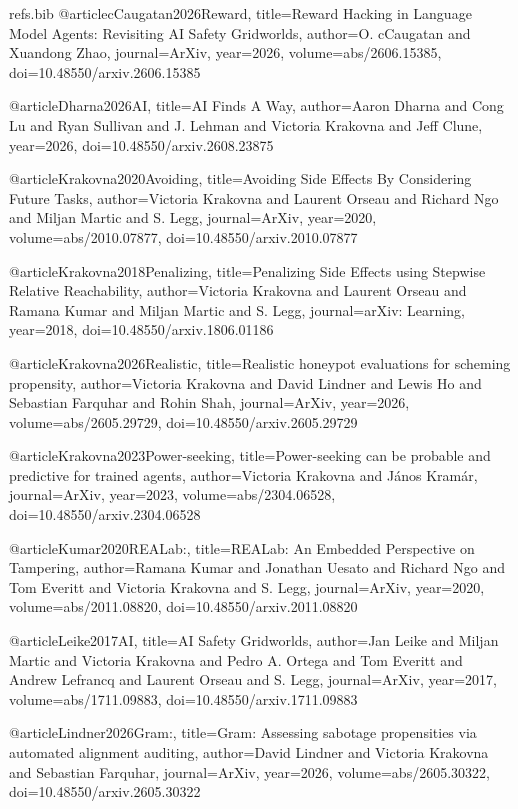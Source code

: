 \begin{filecontents}{refs.bib}
@article{cCaugatan2026Reward,
title={Reward Hacking in Language Model Agents: Revisiting AI Safety Gridworlds},
author={O. cCaugatan and Xuandong Zhao},
journal={ArXiv},
year={2026},
volume={abs/2606.15385},
doi={10.48550/arxiv.2606.15385}
}

@article{Dharna2026AI,
title={AI Finds A Way},
author={Aaron Dharna and Cong Lu and Ryan Sullivan and J. Lehman and Victoria Krakovna and Jeff Clune},
year={2026},
doi={10.48550/arxiv.2608.23875}
}

@article{Krakovna2020Avoiding,
title={Avoiding Side Effects By Considering Future Tasks},
author={Victoria Krakovna and Laurent Orseau and Richard Ngo and Miljan Martic and S. Legg},
journal={ArXiv},
year={2020},
volume={abs/2010.07877},
doi={10.48550/arxiv.2010.07877}
}

@article{Krakovna2018Penalizing,
title={Penalizing Side Effects using Stepwise Relative Reachability},
author={Victoria Krakovna and Laurent Orseau and Ramana Kumar and Miljan Martic and S. Legg},
journal={arXiv: Learning},
year={2018},
doi={10.48550/arxiv.1806.01186}
}

@article{Krakovna2026Realistic,
title={Realistic honeypot evaluations for scheming propensity},
author={Victoria Krakovna and David Lindner and Lewis Ho and Sebastian Farquhar and Rohin Shah},
journal={ArXiv},
year={2026},
volume={abs/2605.29729},
doi={10.48550/arxiv.2605.29729}
}

@article{Krakovna2023Power-seeking,
title={Power-seeking can be probable and predictive for trained agents},
author={Victoria Krakovna and János Kramár},
journal={ArXiv},
year={2023},
volume={abs/2304.06528},
doi={10.48550/arxiv.2304.06528}
}

@article{Kumar2020REALab:,
title={REALab: An Embedded Perspective on Tampering},
author={Ramana Kumar and Jonathan Uesato and Richard Ngo and Tom Everitt and Victoria Krakovna and S. Legg},
journal={ArXiv},
year={2020},
volume={abs/2011.08820},
doi={10.48550/arxiv.2011.08820}
}

@article{Leike2017AI,
title={AI Safety Gridworlds},
author={Jan Leike and Miljan Martic and Victoria Krakovna and Pedro A. Ortega and Tom Everitt and Andrew Lefrancq and Laurent Orseau and S. Legg},
journal={ArXiv},
year={2017},
volume={abs/1711.09883},
doi={10.48550/arxiv.1711.09883}
}

@article{Lindner2026Gram:,
title={Gram: Assessing sabotage propensities via automated alignment auditing},
author={David Lindner and Victoria Krakovna and Sebastian Farquhar},
journal={ArXiv},
year={2026},
volume={abs/2605.30322},
doi={10.48550/arxiv.2605.30322}
}


\end{filecontents}
